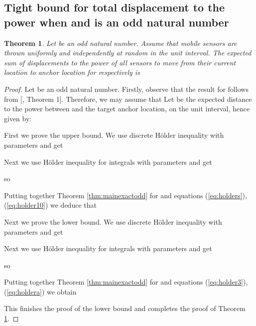\documentclass[final,5p,times,twocolumn]{elsarticle_mod}
\newtheorem{theorem}{Theorem}
\begin{document}
\subsection{Tight bound for total displacement to the power  when  and  is an odd natural number}
\begin{theorem} 
\label{thm:mainexact_oddtwo} 
Let  be an odd natural number. Assume that  mobile sensors are thrown uniformly and independently at random in the unit interval. The expected sum
of displacements to the power  of all sensors to move from their current location to anchor location 
for  respectively is 
\end{theorem}
\begin{proof} Let  be an odd natural number.
Firstly, observe that the result for  follows from [\cite{spa_2013}, Theorem 1]. Therefore, we may assume that 
Let  be the expected distance to the power  between  and the  target anchor location,  on the
unit interval, hence given by:


First we prove the upper bound.
We use discrete H\"older inequality with parameters   
and get

Next we use H\"older inequality for integrals with parameters    and get

so 

Putting together Theorem \ref{thm:mainexactodd} for  and equations (\ref{eq:holders}), (\ref{eq:holder10}) we deduce that


Next we prove the lower bound.
We use discrete H\"older inequality with parameters   
and get

Next we use H\"older inequality for integrals with parameters   and get

so 

Putting together Theorem \ref{thm:mainexactodd} for  and equations (\ref{eq:holder3}), (\ref{eq:holdera}) we obtain

This finishes the proof of the lower bound and completes the proof of Theorem \ref{thm:mainexact_oddtwo}. 
\end{proof}
\end{document}
